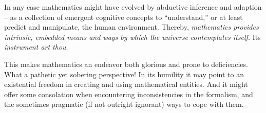 {In any case}
mathematics might have evolved by abductive inference and adaption --
as a collection of emergent cognitive concepts to ``understand,'' or at least predict and manipulate,
the human environment.
Thereby, {\em mathematics provides intrinsic, embedded means and ways by which the universe contemplates itself.}
Its {\em instrument art thou}. %

This makes mathematics an endeavor both glorious and prone to deficiencies.
What a pathetic yet sobering perspective!
In its humility
it may point to an existential freedom\cite{camus-mos} in creating and using mathematical entities.
And it might offer some consolation when
encountering inconsistencies in the formalism,
and the sometimes pragmatic (if not outright ignorant) ways to cope with them.


